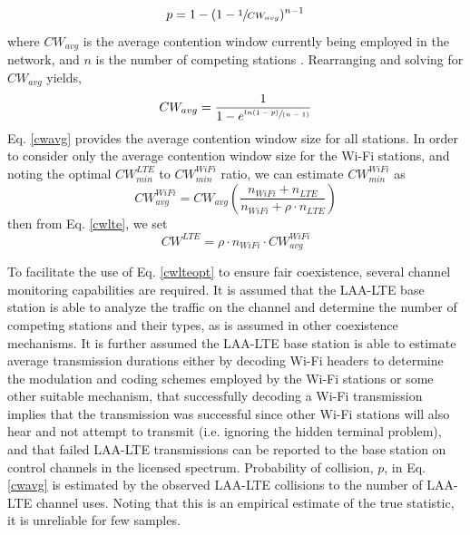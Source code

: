 \begin{equation}\label{pcollision}
p = 1-(1-\sfrac{1}{CW_{avg}})^{n-1}
\end{equation}
where $CW_{avg}$ is the average contention window currently being employed in the network, and $n$ is the number of competing stations \cite{vu}.  Rearranging and solving for $CW_{avg}$ yields,
\begin{equation}\label{cwavg}
CW_{avg} = \frac{1}{1-e^{ \sfrac{ln(1-p)}{(n-1)} }}
\end{equation}
Eq. \ref{cwavg} provides the average contention window size for all stations.  In order to consider only the average contention window size for the \mbox{Wi-Fi} stations, and noting the optimal $CW^{LTE}_{min}$ to $CW^{WiFi}_{min}$ ratio, we can estimate $CW^{WiFi}_{min}$ as
\begin{equation}\label{cwwifi}
CW^{WiFi}_{avg} = CW_{avg}\left ( \frac{n_{WiFi} + n_{LTE}}{n_{WiFi} + \rho\cdot n_{LTE}} \right )
\end{equation}
then from Eq. \ref{cwlte}, we set 
\begin{equation}\label{cwlteopt}
CW^{LTE} = \rho \cdot n_{WiFi} \cdot{CW^{WiFi}_{avg}}
\end{equation}

To facilitate the use of Eq. \ref{cwlteopt} to ensure fair coexistence, several channel monitoring capabilities are required.  It is assumed that the \mbox{LAA-LTE} base station is able to analyze the traffic on the channel and determine the number of competing stations and their types, as is assumed in other coexistence mechanisms.  It is further assumed the \mbox{LAA-LTE} base station is able to estimate average transmission durations either by decoding \mbox{Wi-Fi} headers to determine the modulation and coding schemes employed by the \mbox{Wi-Fi} stations or some other suitable mechanism, that successfully decoding a \mbox{Wi-Fi} transmission implies that the transmission was successful since other \mbox{Wi-Fi} stations will also hear and not attempt to transmit (i.e. ignoring the hidden terminal problem), and that failed \mbox{LAA-LTE} transmissions can be reported to the base station on control channels in the licensed spectrum.  Probability of collision, $p$, in Eq. \ref{cwavg} is estimated by the observed \mbox{LAA-LTE} collisions to the number of \mbox{LAA-LTE} channel uses.  Noting that this is an empirical estimate of the true statistic, it is unreliable for few samples.   


